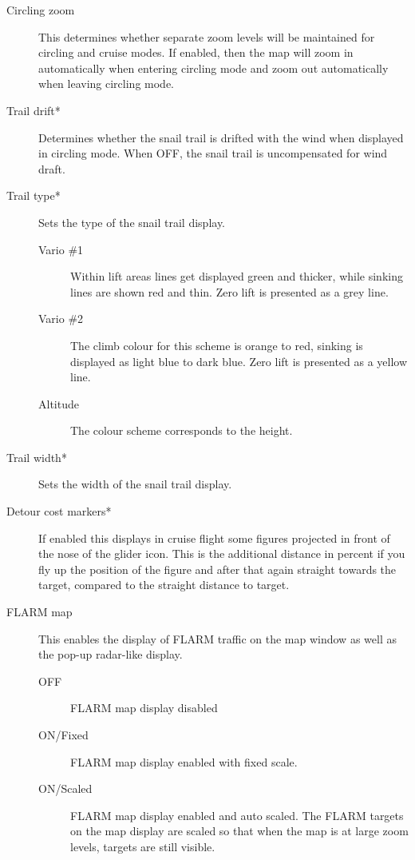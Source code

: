 \begin{description}
\item[Circling zoom] \label{conf:circlingzoom} This determines whether separate
zoom levels will be maintained for circling and cruise modes.  If enabled, then the 
map will zoom in automatically when entering circling mode and zoom out
automatically when leaving circling mode.

\item[Trail drift*] \label{conf:traildrift} Determines whether the
snail trail is drifted with the wind when displayed in circling mode.  When OFF,
the snail trail is uncompensated for wind draft.

\item[Trail type*] \label{conf:snailtype} Sets the type of the snail trail
display.
\begin{description}
\item[Vario \#1]  Within lift areas lines get displayed green and
thicker, while sinking lines are shown red and thin.  Zero lift
is presented as a grey line.
\item[Vario \#2]  The climb colour for this scheme is orange to red, sinking is
displayed as light blue to dark blue. Zero lift
is presented as a yellow line.
\item[Altitude] The colour scheme corresponds to the height.
\end{description}

\item[Trail width*] \label{conf:trailwidth} Sets the width of the snail trail
display.
\item[Detour cost markers*]  If enabled this displays in cruise flight some
figures projected in front of the nose of the glider icon.  This is the
additional distance in percent if you fly up the position of the figure and
after that again straight towards the target, compared to the straight distance
to target.
\item[FLARM map]  \label{conf:flarm-on-map}This enables the display of FLARM
traffic on the map window as well as the pop-up radar-like display.
\begin{description}
\item[OFF]  FLARM map display disabled
\item[ON/Fixed]  FLARM map display enabled with fixed scale.
\item[ON/Scaled]  FLARM map display enabled and auto scaled. The FLARM targets on the map display are 
scaled so that when the map is at large zoom levels, targets are still visible.
\end{description}
\end{description}


